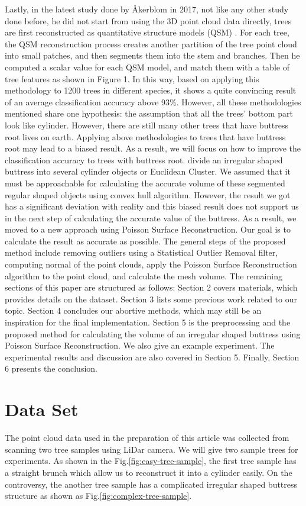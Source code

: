\documentclass[runningheads,a4paper]{llncs}
\begin{document}
Lastly, in the latest study done by Åkerblom in 2017, not like any other study done before, he did not start from using the 3D point cloud data directly, trees are first reconstructed as quantitative structure models (QSM) \cite{5}. For each tree, the QSM reconstruction process creates another partition of the tree point cloud into small patches, and then segments them into the stem and branches. Then he computed a scalar value for each QSM model, and match them with a table of tree features as shown in Figure 1. In this way, based on applying this methodology to 1200 trees in different species, it shows a quite convincing result of an average classification accuracy above 93\%.
However, all these methodologies mentioned share one hypothesis: the assumption that all the trees’ bottom part look like cylinder. However, there are still many other trees that have buttress root lives on earth. Applying above methodologies to trees that have buttress root may lead to a biased result. As a result, we will focus on how to improve the classification accuracy to trees with buttress root.
divide an irregular shaped buttress into several cylinder objects or Euclidean Cluster. We assumed that it must be approachable for calculating the accurate volume of these segmented regular shaped objects using convex hull algorithm. However, the result we got has a significant deviation with reality and this biased result does not support us in the next step of calculating the accurate value of the buttress. As a result, we moved to a new approach using Poisson Surface Reconstruction. Our goal is to calculate the result as accurate as possible. The general steps of the proposed method include removing outliers using a Statistical Outlier Removal filter, computing normal of the point clouds, apply the Poisson Surface Reconstruction algorithm to the point cloud, and calculate the mesh volume.
The remaining sections of this paper are structured as follows: Section 2 covers materials, which provides details on the dataset. Section 3 lists some previous work related to our topic. Section 4 concludes our abortive methods, which may still be an inspiration for the final implementation. Section 5 is the preprocessing and the proposed method for calculating the volume of an irregular shaped buttress using Poisson Surface Reconstruction. We also give an example experiment. The experimental results and discussion are also covered in Section 5. Finally, Section 6 presents the conclusion.




\section{Data Set}
The point cloud data used in the preparation of this article was collected from scanning two tree samples using LiDar camera. We will give two sample trees for experiments. As shown in the Fig.\ref{fig:easy-tree-sample}, the first tree sample has a straight brunch which allow us to reconstruct it into a cylinder easily. On the controversy, the another tree sample has a complicated irregular shaped buttress structure as shown as Fig.\ref{fig:complex-tree-sample}.
\end{document}
